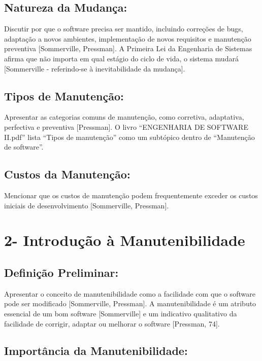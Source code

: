 \documentclass[
]{book}
\begin{document}
\subsection{Natureza da Mudança:}\label{natureza-da-mudanuxe7a}

Discutir por que o software precisa ser mantido, incluindo correções de bugs, adaptação a novos ambientes, implementação de novos requisitos e manutenção preventiva {[}Sommerville, Pressman{]}. A Primeira Lei da Engenharia de Sistemas afirma que não importa em qual estágio do ciclo de vida, o sistema mudará {[}Sommerville - referindo-se à inevitabilidade da mudança{]}.

\subsection{Tipos de Manutenção:}\label{tipos-de-manutenuxe7uxe3o}

Apresentar as categorias comuns de manutenção, como corretiva, adaptativa, perfectiva e preventiva {[}Pressman{]}. O livro ``ENGENHARIA DE SOFTWARE II.pdf'' lista ``Tipos de manutenção'' como um subtópico dentro de ``Manutenção de software''.

\subsection{Custos da Manutenção:}\label{custos-da-manutenuxe7uxe3o}

Mencionar que os custos de manutenção podem frequentemente exceder os custos iniciais de desenvolvimento {[}Sommerville, Pressman{]}.

\section{2- Introdução à Manutenibilidade}\label{introduuxe7uxe3o-uxe0-manutenibilidade}

\subsection{Definição Preliminar:}\label{definiuxe7uxe3o-preliminar}

Apresentar o conceito de manutenibilidade como a facilidade com que o software pode ser modificado {[}Sommerville, Pressman{]}. A manutenibilidade é um atributo essencial de um bom software {[}Sommerville{]} e um indicativo qualitativo da facilidade de corrigir, adaptar ou melhorar o software {[}Pressman, 74{]}.

\subsection{Importância da Manutenibilidade:}\label{importuxe2ncia-da-manutenibilidade}
\end{document}
